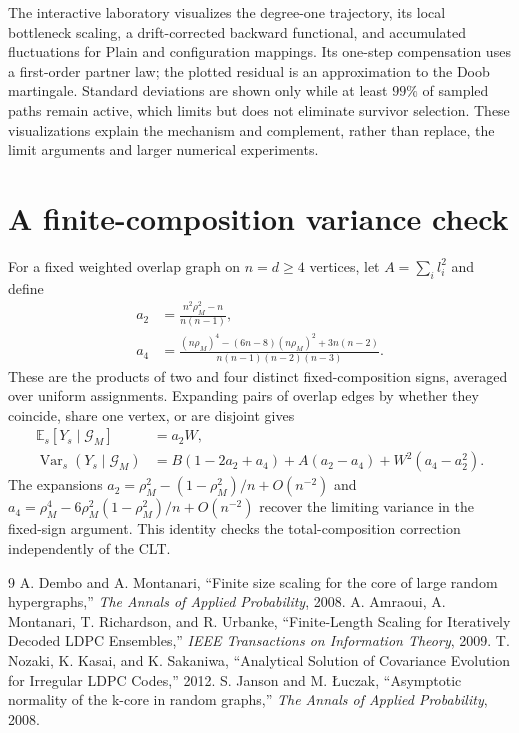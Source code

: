 \documentclass[11pt,a4paper]{article}
\newcommand{\E}{\mathbb E}
\newcommand{\Var}{\operatorname{Var}}
\begin{document}
The interactive laboratory visualizes the degree-one trajectory, its local bottleneck scaling, a drift-corrected backward functional, and accumulated fluctuations for Plain and configuration mappings. Its one-step compensation uses a first-order partner law; the plotted residual is an approximation to the Doob martingale. Standard deviations are shown only while at least $99\%$ of sampled paths remain active, which limits but does not eliminate survivor selection. These visualizations explain the mechanism and complement, rather than replace, the limit arguments and larger numerical experiments.

\appendix
\section{A finite-composition variance check}
For a fixed weighted overlap graph on $n=d\ge4$ vertices, let $A=\sum_i l_i^2$ and define
\begin{align}
a_2&=\frac{n^2\rho_M^2-n}{n(n-1)},\\
a_4&=\frac{(n\rho_M)^4-(6n-8)(n\rho_M)^2+3n(n-2)}
{n(n-1)(n-2)(n-3)}.
\end{align}
These are the products of two and four distinct fixed-composition signs, averaged over uniform assignments. Expanding pairs of overlap edges by whether they coincide, share one vertex, or are disjoint gives
\begin{align}
\E_s[Y_s\mid\mathcal G_M]&=a_2W,\\
\Var_s(Y_s\mid\mathcal G_M)
&=B(1-2a_2+a_4)+A(a_2-a_4)+W^2(a_4-a_2^2).
\end{align}
The expansions
$a_2=\rho_M^2-(1-\rho_M^2)/n+O(n^{-2})$ and
$a_4=\rho_M^4-6\rho_M^2(1-\rho_M^2)/n+O(n^{-2})$
recover the limiting variance in the fixed-sign argument. This identity checks the total-composition correction independently of the CLT.

\begin{thebibliography}{9}
 A. Dembo and A. Montanari, ``Finite size scaling for the core of large random hypergraphs,'' \emph{The Annals of Applied Probability}, 2008.
 A. Amraoui, A. Montanari, T. Richardson, and R. Urbanke, ``Finite-Length Scaling for Iteratively Decoded LDPC Ensembles,'' \emph{IEEE Transactions on Information Theory}, 2009.
 T. Nozaki, K. Kasai, and K. Sakaniwa, ``Analytical Solution of Covariance Evolution for Irregular LDPC Codes,'' 2012.
 S. Janson and M. {\L}uczak, ``Asymptotic normality of the k-core in random graphs,'' \emph{The Annals of Applied Probability}, 2008.
\end{thebibliography}
\end{document}

